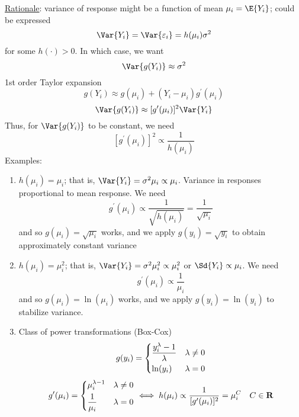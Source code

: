 \begin{enumerate}[label=(\arabic*)]
          \underline{Rationale}: variance of response might be a function
          of mean $ \mu_i=\E{Y_i} $; could be expressed
          \[ \Var{Y_i}=\Var{\varepsilon_i}=h(\mu_i)\sigma^2 \]
          for some $ h(\cdot)>0 $. In which case, we want
          \[ \Var{g(Y_i)}\approx \sigma^2 \]
          1st order Taylor expansion
          \[ g(Y_i)\approx g(\mu_i)+(Y_i-\mu_i)g^\prime(\mu_i) \]
          \[ \Var{g(Y_i)}\approx [g^\prime(\mu_i)]^2\Var{Y_i} \]
          Thus, for $ \Var{g(Y_i)} $ to be constant, we need
          \[ [g^\prime(\mu_i)]^2\propto \frac{1}{h(\mu_i)} \]
          Examples:
          \begin{enumerate}[label=(\roman*)]
              \item $ h(\mu_i)=\mu_i $; that is,
                    $ \Var{Y_i}=\sigma^2 \mu_i\propto \mu_i $.
                    Variance in responses proportional to mean response.
                    We need
                    \[ g^\prime(\mu_i)\propto \frac{1}{\sqrt{h(\mu_i)}}=
                        \frac{1}{\sqrt{\mu_i}} \]
                    and so $ g(\mu_i)=\sqrt{\mu_i} $ works,
                    and we apply $ g(y_i)=\sqrt{y_i} $
                    to obtain approximately constant variance
              \item $ h(\mu_i)=\mu_i^2 $; that is,
                    $ \Var{Y_i}=\sigma^2\mu_i^2 \propto \mu_i^2 $
                    or
                    $ \Sd{Y_i}\propto \mu_i $.
                    We need
                    \[ g^\prime(\mu_i)\propto\frac{1}{\mu_i} \]
                    and so $ g(\mu_i)=\ln(\mu_i) $ works, and we apply
                    $ g(y_i)=\ln(y_i) $
                    to stabilize variance.
              \item Class of power transformations (Box-Cox)
                    \[ g(y_i)=\begin{dcases}
                            \frac{y_i^\lambda -1}{\lambda} & \lambda\neq 0 \\
                            \ln(y_i)                       & \lambda=0
                        \end{dcases} \]
                    \[ g^\prime(\mu_i)=\begin{dcases}
                            \mu_i^{\lambda-1} & \lambda\neq 0 \\
                            \frac{1}{\mu_i}   & \lambda=0
                        \end{dcases}\iff h(\mu_i)\propto \frac{1}{[g^\prime(\mu_i)]^2}
                        =\mu_i^C \quad {C\in\mathbf{R}}  \]

\end{enumerate}
\end{enumerate}
